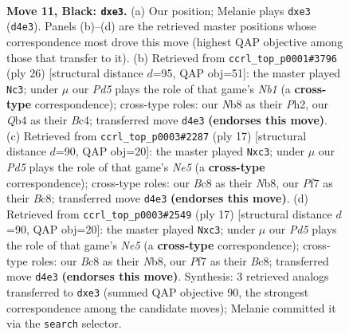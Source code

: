 \documentclass[11pt]{article}
\begin{document}
\clearpage

\begin{figure}[p]\centering
\begin{subfigure}{0.46\textwidth}\centering
\resizebox{\linewidth}{!}{%
\newchessgame
\chessboard[
  setfen={rnb2rk1/pp3ppp/4pn2/8/1qBp3P/4PN2/PP1N1PP1/R2QK2R b KQ - 2 11},
  showmover=false,
  pgfstyle=straightmove, color=movearrow, markmove={d4-e3}
]}
\caption{}
\end{subfigure}\hfill
\begin{subfigure}{0.46\textwidth}\centering
\resizebox{\linewidth}{!}{%
\newchessgame
\chessboard[
  setfen={r3kr2/pppbn1pp/4qp2/3n4/2B5/1P1PPQ2/P4PPP/RN3RK1 w q - 1 14},
  showmover=false,
  pgfstyle=straightmove, color=movearrow, markmove={b1-c3}
]}
\caption{}
\end{subfigure}
\\[4pt]
\begin{subfigure}{0.46\textwidth}\centering
\resizebox{\linewidth}{!}{%
\newchessgame
\chessboard[
  setfen={rnbqk2r/ppp2pbp/3p4/8/3PnBpP/2NN4/PPP3P1/R2QKB1R b KQkq - 2 9},
  showmover=false,
  pgfstyle=straightmove, color=movearrow, markmove={e4-c3}
]}
\caption{}
\end{subfigure}\hfill
\begin{subfigure}{0.46\textwidth}\centering
\resizebox{\linewidth}{!}{%
\newchessgame
\chessboard[
  setfen={rnbqk2r/ppp2pbp/3p4/8/3PnBpP/2NN4/PPP3P1/R2QKB1R b KQkq - 2 9},
  showmover=false,
  pgfstyle=straightmove, color=movearrow, markmove={e4-c3}
]}
\caption{}
\end{subfigure}
\caption{\textbf{Move 11, Black: \texttt{dxe3}.} (a) Our position; Melanie plays \texttt{dxe3} (\texttt{d4e3}). Panels (b)--(d) are the retrieved master positions whose correspondence most drove this move (highest QAP objective among those that transfer to it). (b) Retrieved from \texttt{ccrl\_top\_p0001\#3796} (ply 26) [structural distance $d$=95, QAP obj=51]: the master played \texttt{Nc3}; under $\mu$ our \emph{Pd5} plays the role of that game's \emph{Nb1} (a \textbf{cross-type} correspondence); cross-type roles: our \emph{N}b8 as their \emph{P}h2, our \emph{Q}b4 as their \emph{B}c4; transferred move \texttt{d4e3} \textbf{(endorses this move)}. (c) Retrieved from \texttt{ccrl\_top\_p0003\#2287} (ply 17) [structural distance $d$=90, QAP obj=20]: the master played \texttt{Nxc3}; under $\mu$ our \emph{Pd5} plays the role of that game's \emph{Ne5} (a \textbf{cross-type} correspondence); cross-type roles: our \emph{B}c8 as their \emph{N}b8, our \emph{P}f7 as their \emph{B}c8; transferred move \texttt{d4e3} \textbf{(endorses this move)}. (d) Retrieved from \texttt{ccrl\_top\_p0003\#2549} (ply 17) [structural distance $d$=90, QAP obj=20]: the master played \texttt{Nxc3}; under $\mu$ our \emph{Pd5} plays the role of that game's \emph{Ne5} (a \textbf{cross-type} correspondence); cross-type roles: our \emph{B}c8 as their \emph{N}b8, our \emph{P}f7 as their \emph{B}c8; transferred move \texttt{d4e3} \textbf{(endorses this move)}. Synthesis: 3 retrieved analogs transferred to \texttt{dxe3} (summed QAP objective 90, the strongest correspondence among the candidate moves); Melanie committed it via the \texttt{search} selector.}
\label{fig:thought-m21}
\end{figure}
\end{document}
